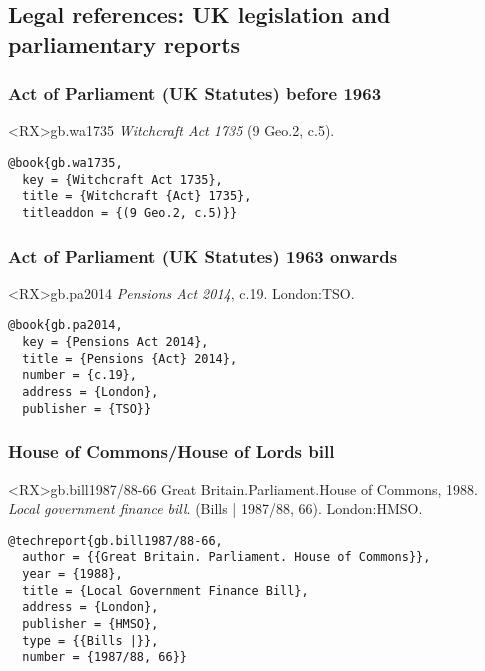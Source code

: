 \documentclass[10pt,a4paper]{article}
\begin{document}
\subsection{Legal references: UK legislation and parliamentary reports}


\subsubsection*{Act of Parliament (UK Statutes) before 1963}

\begin{bibexbox}<RX>{gb.wa1735}
  \emph{Witchcraft Act 1735} (9 Geo.2, c.5).
  \tcblower
\begin{Verbatim}
@book{gb.wa1735,
  key = {Witchcraft Act 1735},
  title = {Witchcraft {Act} 1735},
  titleaddon = {(9 Geo.2, c.5)}}
\end{Verbatim}
\end{bibexbox}

\subsubsection*{Act of Parliament (UK Statutes) 1963 onwards}

\begin{bibexbox}<RX>{gb.pa2014}
  \emph{Pensions Act 2014}, c.19. London:\@ TSO.
  \tcblower
\begin{Verbatim}
@book{gb.pa2014,
  key = {Pensions Act 2014},
  title = {Pensions {Act} 2014},
  number = {c.19},
  address = {London},
  publisher = {TSO}}
\end{Verbatim}
\end{bibexbox}

\subsubsection*{House of Commons/House of Lords bill}

\begin{bibexbox}<RX>{gb.bill1987/88-66}
  Great Britain.\@ Parliament.\@ House of Commons, 1988. \emph{Local government finance bill}. (Bills | 1987/88, 66). London:\@ HMSO.
  \tcblower
\begin{Verbatim}
@techreport{gb.bill1987/88-66,
  author = {{Great Britain. Parliament. House of Commons}},
  year = {1988},
  title = {Local Government Finance Bill},
  address = {London},
  publisher = {HMSO},
  type = {{Bills |}},
  number = {1987/88, 66}}
\end{Verbatim}
\end{bibexbox}
\end{document}
